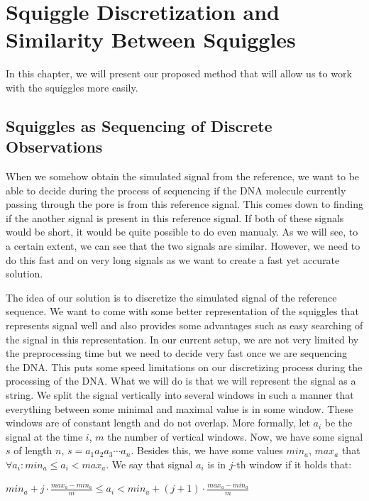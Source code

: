 \chapter{Squiggle Discretization and Similarity Between Squiggles}

\label{kap:proposedMethod} %

In this chapter, we will present our proposed method that will allow us to work
with the squiggles more easily.

\section{Squiggles as Sequencing of Discrete Observations}

When we somehow obtain the simulated signal from the reference, we want to be able
to decide during the process of sequencing if the DNA molecule currently passing
through the pore is from this reference signal. This comes down to finding if the
another signal is present in this reference signal. If both of these signals would
be short, it would be quite possible to do even manualy. As we will see, to a
certain extent, we can see that the two signals are similar. However, we need to
do this fast and on very long signals as we want to create a fast yet accurate solution.

The idea of our solution is to discretize the simulated signal of the
reference sequence. We want to come with some better representation of the
squiggles that represents signal well and also provides some advantages such as
easy searching of the signal in this representation. In our current setup, we are
not very limited by the preprocessing time but we need to decide very fast once
we are sequencing the DNA. This puts some speed limitations on our discretizing
process during the processing of the DNA. What we will do is that we will
represent the signal as a string. We split the signal vertically into several
windows in such a manner that everything between some minimal and maximal
value is in some window. These windows are of constant length and do not
overlap. More formally, let $a_i$ be the signal at the time $i$, $m$ the number of
vertical windows. Now, we have some signal $s$ of length $n$, $s=a_1a_2a_3\cdots a_n$.
Besides this, we have some values $min_a$, $max_a$ that $\forall a_i: min_a \leq a_i < max_a$.
We say that signal $a_i$ is in $j$-th window if it holds that:

\begin{center}
$min_a + j\cdot \frac{max_a-min_a}{m} \leq a_i < min_a + (j+1)\cdot \frac{max_a-min_a}{m}$
\end{center}


